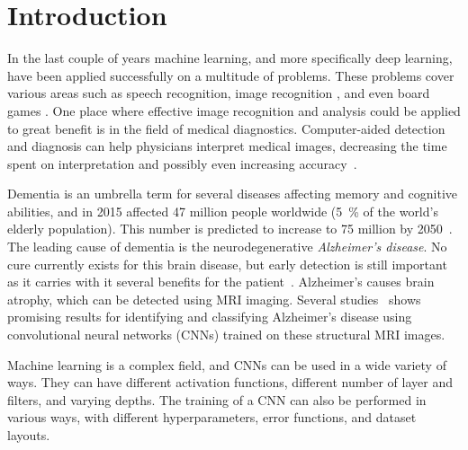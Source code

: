 \documentclass{kththesis}
\begin{document}
\setcounter{secnumdepth}{2}
\setcounter{tocdepth}{2}
\tableofcontents


\mainmatter

\chapter{Introduction}
In the last couple of years machine learning, and more specifically deep learning, have been applied successfully on a multitude of problems. These problems cover various areas such as speech recognition, image recognition \parencite{krizhevsky2012imagenet}, and even board games \parencite{silver2018general}. One place where effective image recognition and analysis could be applied to great benefit is in the field of medical diagnostics. Computer-aided detection and diagnosis can help physicians interpret medical images, decreasing the time spent on interpretation and possibly even increasing accuracy~\cite{erickson2017machine}.

Dementia is an umbrella term for several diseases affecting memory and cognitive abilities, and in 2015 affected 47 million people worldwide (5~\% of the world’s elderly population). This number is predicted to increase to 75 million by 2050~\cite{dementiaWHO}. The leading cause of dementia is the neurodegenerative \textit{Alzheimer’s disease}. No cure currently exists for this brain disease, but early detection is still important as it carries with it several benefits for the patient~\cite{factsfigures2018}. Alzheimer's causes brain atrophy, which can be detected using MRI imaging. Several studies~\cite{islam2017novel, islam2018early} shows promising results for identifying and classifying Alzheimer’s disease using convolutional neural networks (CNNs) trained on these structural MRI images.

Machine learning is a complex field, and CNNs can be used in a wide variety of ways. They can have different activation functions, different number of layer and filters, and varying depths. The training of a CNN can also be performed in various ways, with different hyperparameters, error functions, and dataset layouts.
\end{document}
